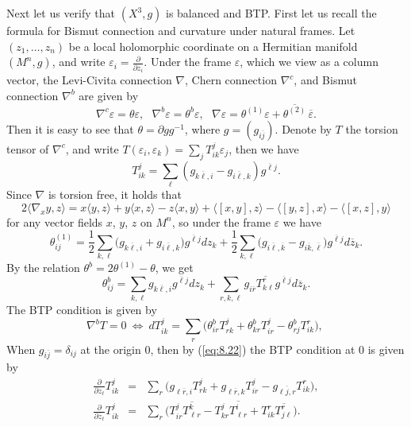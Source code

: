 \documentclass{amsart}
\numberwithin{equation}{section}
\theoremstyle{definition}
\renewcommand{\1}{\mathds{1}}
\renewcommand{\>}{\rightarrow}
\begin{document}
Next let us verify that $(X^3,g)$ is balanced and BTP. First let us recall the formula for Bismut connection and curvature under natural frames. Let $(z_1, \ldots , z_n)$ be a local holomorphic coordinate on a Hermitian manifold $(M^n,g)$, and write $\varepsilon_i=\frac{\partial}{\partial z_i}$. Under the frame $\varepsilon$, which we view as a column vector, the Levi-Civita connection $\nabla$, Chern connection $\nabla^c$, and Bismut connection $\nabla^b$ are given by
$$ \nabla^c \varepsilon = \theta \varepsilon, \ \ \ \nabla^b \varepsilon = \theta^b \varepsilon, \ \ \ \nabla \varepsilon = \theta^{(1)} \varepsilon + \overline{\theta^{(2)}} \,\overline{ \varepsilon}. $$
Then it is easy to see that $\theta =\partial g g^{-1}$, where $g=(g_{i\overline{j}})$. Denote by $T$ the torsion tensor of $\nabla^c$, and write
$T(\varepsilon_i , \varepsilon_k) = \sum_j T^j_{ik} \varepsilon_j$, then we have
\begin{equation} \label{eq:8.20}
 T^j_{ik} = \sum_{\ell} (g_{k\overline{\ell},i } - g_{i\overline{\ell},k }) g^{\overline{\ell}j} .
 \end{equation}
Since $\nabla$ is torsion free, it holds that
$$ 2\langle \nabla_xy,z\rangle = x\langle y,z\rangle + y\langle x,z\rangle -z \langle x,y\rangle +\langle [x,y],z\rangle - \langle [y,z],x\rangle - \langle [x,z],y\rangle $$
for any vector fields $x$, $y$, $z$ on $M^n$, so under the frame $\varepsilon$ we have
\begin{equation} \label{eq:8.21}
 \theta^{(1)}_{ij} = \frac{1}{2}\sum_{k,\ell} \big( g_{k\overline{\ell},i } + g_{i\overline{\ell},k }\big)g^{\overline{\ell}j}  dz_k +  \frac{1}{2}\sum_{k,\ell} \big( g_{i\overline{\ell},\overline{k} } - g_{i\overline{k},\overline{\ell} }\big) g^{\overline{\ell}j} d\overline{z}_k.
 \end{equation}
By the relation $\theta^b=2\theta^{(1)} -\theta$, we get
\begin{equation} \label{eq:8.22}
 \theta^b_{ij} = \sum_{k,\ell} g_{k\overline{\ell},i } g^{\overline{\ell}j}  dz_k +  \sum_{r,k,\ell} g_{i\overline{r}}\overline{T^r_{k\ell} }  g^{\overline{\ell}j} d\overline{z}_k.
 \end{equation}
The BTP condition is given by
\begin{equation} \label{eq:8.23}
\nabla^bT=0 \ \Longleftrightarrow \  dT^j_{ik} =\sum_r \big( \theta^b_{ir} T^j_{rk} + \theta^b_{kr} T^j_{ir} - \theta^b_{rj} T^r_{ik} \big), \ %
 \end{equation}
When $g_{i\overline{j}}=\delta_{ij}$ at the origin $0$, then by (\ref{eq:8.22}) the BTP condition at $0$  is given by \begin{eqnarray}
\frac{\partial}{\partial z_{\ell}} T^j_{ik} & = & \sum_r \big(   g_{\ell \overline{r},i} T^j_{rk} +   g_{\ell \overline{r},k} T^j_{ir} -  g_{\ell \overline{j},r} T^r_{ik}   \big) ,\label{eq:8.24} \\
 \frac{\partial}{\partial \overline{z}_{\ell}} T^j_{ik} & = &  \sum_r \big(   T^j_{ir} \overline{ T^k_{\ell r}} -   T^j_{kr} \overline{ T^i_{\ell r}} +  T^r_{ik} \overline{ T^r_{j\ell }}   \big)  .\label{eq:8.25}
\end{eqnarray}
\end{document}
